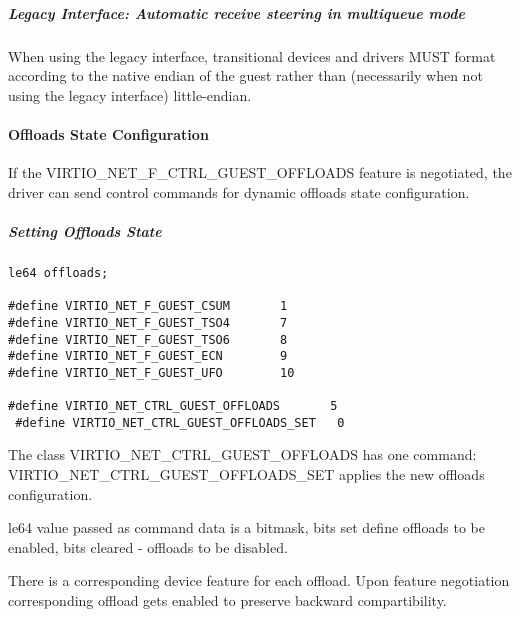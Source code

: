 \subparagraph{Legacy Interface: Automatic receive steering in multiqueue mode}\label{sec:Device Types / Network Device / Device Operation / Control Virtqueue / Automatic receive steering in multiqueue mode / Legacy Interface: Automatic receive steering in multiqueue mode}
When using the legacy interface, transitional devices and drivers
MUST format 
according to the native endian of the guest rather than
(necessarily when not using the legacy interface) little-endian.

\paragraph{Offloads State Configuration}\label{sec:Device Types / Network Device / Device Operation / Control Virtqueue / Offloads State Configuration}

If the VIRTIO_NET_F_CTRL_GUEST_OFFLOADS feature is negotiated, the driver can
send control commands for dynamic offloads state configuration.

\subparagraph{Setting Offloads State}\label{sec:Device Types / Network Device / Device Operation / Control Virtqueue / Offloads State Configuration / Setting Offloads State}

\begin{lstlisting}
le64 offloads;

#define VIRTIO_NET_F_GUEST_CSUM       1
#define VIRTIO_NET_F_GUEST_TSO4       7
#define VIRTIO_NET_F_GUEST_TSO6       8
#define VIRTIO_NET_F_GUEST_ECN        9
#define VIRTIO_NET_F_GUEST_UFO        10

#define VIRTIO_NET_CTRL_GUEST_OFFLOADS       5
 #define VIRTIO_NET_CTRL_GUEST_OFFLOADS_SET   0
\end{lstlisting}

The class VIRTIO_NET_CTRL_GUEST_OFFLOADS has one command:
VIRTIO_NET_CTRL_GUEST_OFFLOADS_SET applies the new offloads configuration.

le64 value passed as command data is a bitmask, bits set define
offloads to be enabled, bits cleared - offloads to be disabled.

There is a corresponding device feature for each offload. Upon feature
negotiation corresponding offload gets enabled to preserve backward
compartibility.


